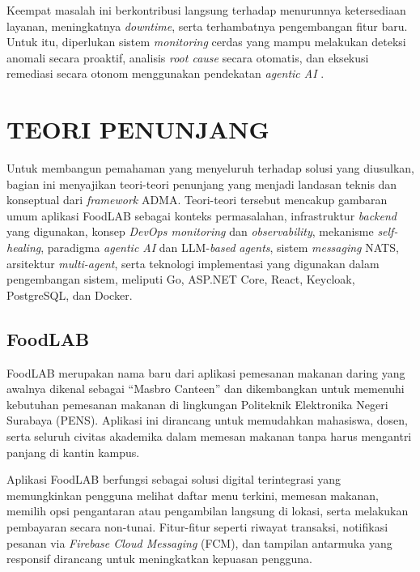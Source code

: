 Keempat masalah ini berkontribusi langsung terhadap menurunnya ketersediaan layanan, meningkatnya \textit{downtime}, serta terhambatnya pengembangan fitur baru. Untuk itu, diperlukan sistem \textit{monitoring} cerdas yang mampu melakukan deteksi anomali secara proaktif, analisis \textit{root cause} secara otomatis, dan eksekusi remediasi secara otonom menggunakan pendekatan \textit{agentic AI} \cite{xu2025large}.

\section{TEORI PENUNJANG}

Untuk membangun pemahaman yang menyeluruh terhadap solusi yang diusulkan, bagian ini menyajikan teori-teori penunjang yang menjadi landasan teknis dan konseptual dari \textit{framework} ADMA. Teori-teori tersebut mencakup gambaran umum aplikasi FoodLAB sebagai konteks permasalahan, infrastruktur \textit{backend} yang digunakan, konsep \textit{DevOps monitoring} dan \textit{observability}, mekanisme \textit{self-healing}, paradigma \textit{agentic AI} dan LLM-\textit{based} \textit{agents}, sistem \textit{messaging} NATS, arsitektur \textit{multi-agent}, serta teknologi implementasi yang digunakan dalam pengembangan sistem, meliputi Go, ASP.NET Core, React, Keycloak, PostgreSQL, dan Docker.

\subsection{FoodLAB}

FoodLAB merupakan nama baru dari aplikasi pemesanan makanan daring yang awalnya dikenal sebagai ``Masbro Canteen'' dan dikembangkan untuk memenuhi kebutuhan pemesanan makanan di lingkungan Politeknik Elektronika Negeri Surabaya (PENS). Aplikasi ini dirancang untuk memudahkan mahasiswa, dosen, serta seluruh civitas akademika dalam memesan makanan tanpa harus mengantri panjang di kantin kampus.

Aplikasi FoodLAB berfungsi sebagai solusi digital terintegrasi yang memungkinkan pengguna melihat daftar menu terkini, memesan makanan, memilih opsi pengantaran atau pengambilan langsung di lokasi, serta melakukan pembayaran secara non-tunai. Fitur-fitur seperti riwayat transaksi, notifikasi pesanan via \textit{Firebase Cloud Messaging} (FCM), dan tampilan antarmuka yang responsif dirancang untuk meningkatkan kepuasan pengguna.

